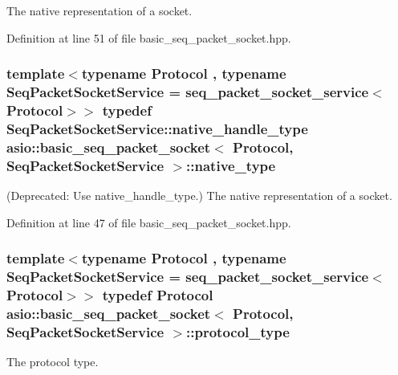 The native representation of a socket. 



Definition at line 51 of file basic\+\_\+seq\+\_\+packet\+\_\+socket.\+hpp.

\hypertarget{classasio_1_1basic__seq__packet__socket_ad1bba59e6063a95b9449d847dec117db}{}
\subsubsection[{native\+\_\+type}]{\setlength{\rightskip}{0pt plus 5cm}template$<$typename Protocol , typename Seq\+Packet\+Socket\+Service  = seq\+\_\+packet\+\_\+socket\+\_\+service$<$\+Protocol$>$$>$ typedef Seq\+Packet\+Socket\+Service\+::native\+\_\+handle\+\_\+type {\bf asio\+::basic\+\_\+seq\+\_\+packet\+\_\+socket}$<$ Protocol, Seq\+Packet\+Socket\+Service $>$\+::{\bf native\+\_\+type}}\label{classasio_1_1basic__seq__packet__socket_ad1bba59e6063a95b9449d847dec117db}
(Deprecated\+: Use native\+\_\+handle\+\_\+type.) The native representation of a socket. 

Definition at line 47 of file basic\+\_\+seq\+\_\+packet\+\_\+socket.\+hpp.

\hypertarget{classasio_1_1basic__seq__packet__socket_a683a8578f6465370482fd9f3b51ac0ea}{}
\subsubsection[{protocol\+\_\+type}]{\setlength{\rightskip}{0pt plus 5cm}template$<$typename Protocol , typename Seq\+Packet\+Socket\+Service  = seq\+\_\+packet\+\_\+socket\+\_\+service$<$\+Protocol$>$$>$ typedef Protocol {\bf asio\+::basic\+\_\+seq\+\_\+packet\+\_\+socket}$<$ Protocol, Seq\+Packet\+Socket\+Service $>$\+::{\bf protocol\+\_\+type}}\label{classasio_1_1basic__seq__packet__socket_a683a8578f6465370482fd9f3b51ac0ea}


The protocol type. 



